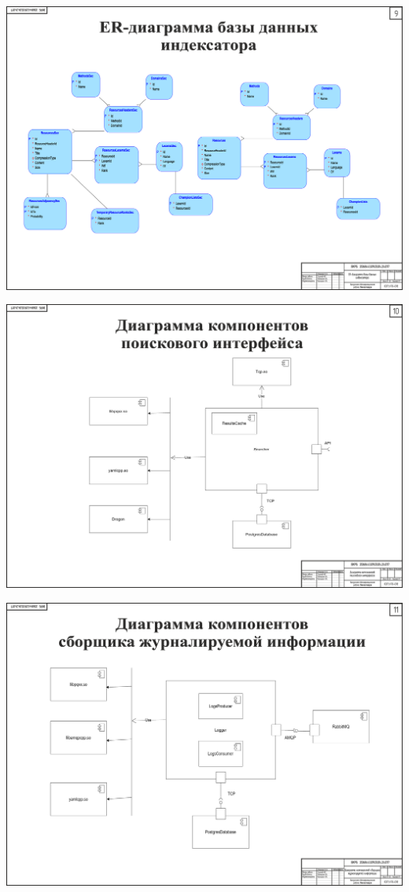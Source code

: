 \begin{landscape}
\begin{плакат}
    \includegraphics[width=0.82\linewidth]{posters/pi2.eps}
    \label{pi2:image}      
\end{плакат}

\begin{плакат}
    \includegraphics[width=0.82\linewidth]{posters/ps1.eps}
    \label{ps1:image}      
\end{плакат}

\begin{плакат}
    \includegraphics[width=0.82\linewidth]{posters/pl1.eps}
    \label{pl1:image}      
\end{плакат}


\end{landscape}
